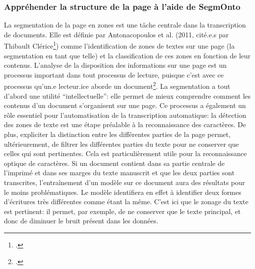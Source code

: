 \subsubsection{Appréhender la structure de la page à l'aide de SegmOnto}
La segmentation de la page en zones est une tâche centrale dans la transcription de documents. Elle est définie par Antonacopoulos et al. (2011, cité.e.s par Thibault Clérice\footcite[p. 4]{clerice_you_2022}) comme l'identification de zones de textes sur une page (la segmentation en tant que telle) et la classification de ces zones en fonction de leur contenus. L'analyse de la disposition des informations sur une page est un processus important dans tout processus de lecture, puisque c'est avec ce processus qu'un.e lecteur.ice aborde un document\footcite{christensen_segmonto_2022}. La segmentation a tout d'abord une utilité \enquote{intellectuelle}: elle permet de mieux comprendre comment les contenus d'un document s'organisent sur une page. Ce processus a également un rôle essentiel pour l'automatisation de la transcription automatique: la détection des zones de texte est une étape préalable à la reconnaissance des caractères. De plus, expliciter la distinction entre les différentes parties de la page permet, ultérieurement, de filtrer les différentes parties du texte pour ne conserver que celles qui sont pertinentes. Cela est particulièrement utile pour la reconnaissance optique de caractères. Si un document contient dans sa partie centrale de l'imprimé et dans ses marges du texte manuscrit et que les deux parties sont transcrites, l'entraînement d'un modèle sur ce document aura des résultats pour le moins problématiques. Le modèle identifiera en effet à identifier deux formes d'écritures très différentes comme étant la même. C'est ici que le zonage du texte est pertinent: il permet, par exemple, de ne conserver que le texte principal, et donc de diminuer le bruit présent dans les données.

